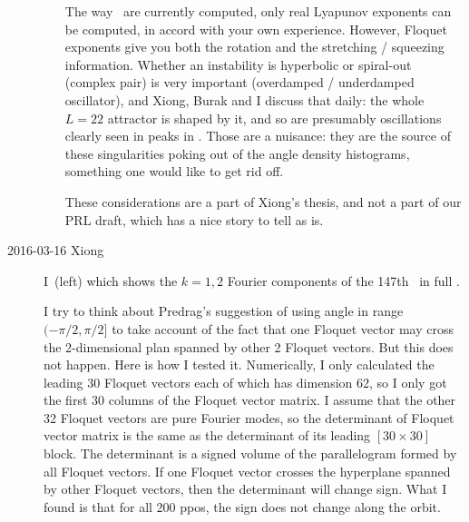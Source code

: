 \begin{description}
\begin{enumerate}
The way \cLvs\ are currently computed, only real Lyapunov exponents can
be computed, in accord with your own experience. However, Floquet
exponents give you both the rotation and the stretching / squeezing information.
Whether an instability is hyperbolic or spiral-out (complex pair) is very
important (overdamped / underdamped oscillator), and Xiong, Burak and I
discuss that daily: the whole \KS\ $L=22$ attractor is shaped by it, and
so are presumably oscillations clearly seen in peaks in
. Those are a nuisance: they are the source of
these singularities poking out of the angle density histograms, something
one would like to get rid off.

These considerations are a part of
Xiong's thesis, and not a part of our PRL draft, which has a nice story
to tell as is.

\end{enumerate}

%
%

\item[2016-03-16 Xiong]
I \,(left) which shows the $k=1,2$ Fourier components
of the 147th \ppo\ in full \statesp.

I try to think about Predrag's suggestion of using angle in range
$(-\pi/2, \pi/2]$ to take account of the fact that one Floquet
vector may cross the 2-dimensional plan spanned by other 2 Floquet vectors.
But this does not happen. Here is how I tested it. Numerically, I only
calculated the leading 30 Floquet vectors each of which has dimension
62, so I only got the first 30 columns of the Floquet vector matrix.
I assume that the other 32 Floquet vectors are pure Fourier modes,
so the determinant of Floquet vector matrix is the same as the
determinant of its leading $[30\times 30]$ block. The determinant
is a signed volume of the parallelogram formed by all Floquet vectors.
If one Floquet vector crosses the hyperplane spanned by other Floquet vectors,
then the determinant will change sign. What I found is that for
all 200 ppos, the sign does not change along the orbit.


\end{description}
